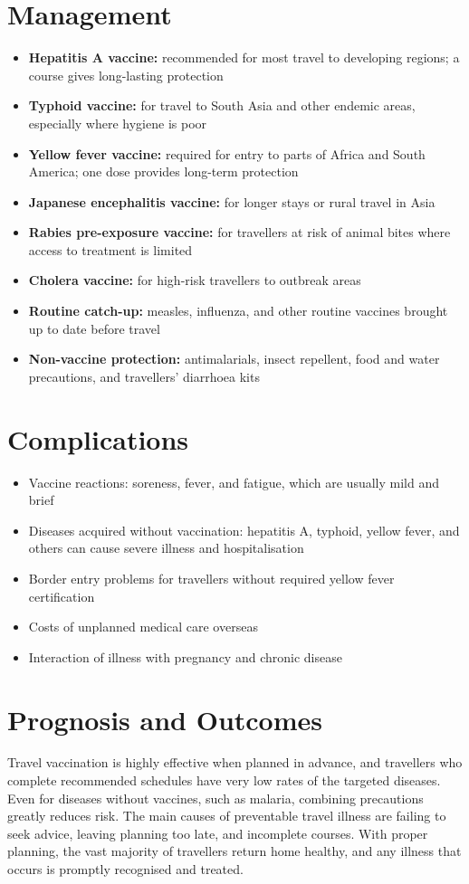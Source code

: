 \section*{Management}
\begin{itemize}
    \item \textbf{Hepatitis A vaccine:} recommended for most travel to developing regions; a course gives long-lasting protection
    \item \textbf{Typhoid vaccine:} for travel to South Asia and other endemic areas, especially where hygiene is poor
    \item \textbf{Yellow fever vaccine:} required for entry to parts of Africa and South America; one dose provides long-term protection
    \item \textbf{Japanese encephalitis vaccine:} for longer stays or rural travel in Asia
    \item \textbf{Rabies pre-exposure vaccine:} for travellers at risk of animal bites where access to treatment is limited
    \item \textbf{Cholera vaccine:} for high-risk travellers to outbreak areas
    \item \textbf{Routine catch-up:} measles, influenza, and other routine vaccines brought up to date before travel
    \item \textbf{Non-vaccine protection:} antimalarials, insect repellent, food and water precautions, and travellers' diarrhoea kits
\end{itemize}

\section*{Complications}
\begin{itemize}
    \item Vaccine reactions: soreness, fever, and fatigue, which are usually mild and brief
    \item Diseases acquired without vaccination: hepatitis A, typhoid, yellow fever, and others can cause severe illness and hospitalisation
    \item Border entry problems for travellers without required yellow fever certification
    \item Costs of unplanned medical care overseas
    \item Interaction of illness with pregnancy and chronic disease
\end{itemize}

\section*{Prognosis and Outcomes}
Travel vaccination is highly effective when planned in advance, and travellers who complete recommended schedules have very low rates of the targeted diseases. Even for diseases without vaccines, such as malaria, combining precautions greatly reduces risk. The main causes of preventable travel illness are failing to seek advice, leaving planning too late, and incomplete courses. With proper planning, the vast majority of travellers return home healthy, and any illness that occurs is promptly recognised and treated.

